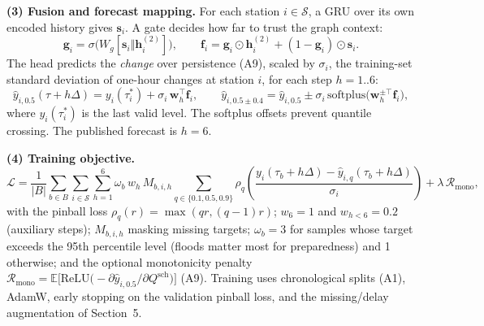 \textbf{(3) Fusion and forecast mapping.} For each station $i\in\mathcal{S}$, a GRU over its own
encoded history gives $\mathbf{s}_i$. A gate decides how far to trust the graph context:
\begin{equation}
\mathbf{g}_i=\sigma\big(W_g[\mathbf{s}_i\Vert\mathbf{h}^{(2)}_i]\big),\qquad
\mathbf{f}_i=\mathbf{g}_i\odot\mathbf{h}^{(2)}_i+(1-\mathbf{g}_i)\odot\mathbf{s}_i .
\end{equation}
The head predicts the \emph{change} over persistence (A9), scaled by $\sigma_i$, the training-set
standard deviation of one-hour changes at station $i$, for each step $h=1..6$:
\begin{equation}
\hat y_{i,0.5}(\tau+h\Delta)=y_i(\tau^{\ast}_i)+\sigma_i\,\mathbf{w}_{h}^{\top}\mathbf{f}_i,\qquad
\hat y_{i,0.5\pm0.4}=\hat y_{i,0.5}\pm\sigma_i\,\mathrm{softplus}\big(\mathbf{w}^{\pm\top}_{h}\mathbf{f}_i\big),
\end{equation}
where $y_i(\tau^{\ast}_i)$ is the last valid level. The softplus offsets prevent quantile crossing.
The published forecast is $h=6$.

\textbf{(4) Training objective.}
\begin{equation}
\mathcal{L}=\frac{1}{|B|}\sum_{b\in B}\sum_{i\in\mathcal{S}}\sum_{h=1}^{6}\omega_{b}\,w_h\,M_{b,i,h}
\sum_{q\in\{0.1,0.5,0.9\}}\rho_q\!\left(\frac{y_i(\tau_b+h\Delta)-\hat y_{i,q}(\tau_b+h\Delta)}{\sigma_i}\right)
+\lambda\,\mathcal{R}_{\mathrm{mono}},
\end{equation}
with the pinball loss $\rho_q(r)=\max(qr,(q-1)r)$; $w_6=1$ and $w_{h<6}=0.2$ (auxiliary steps);
$M_{b,i,h}$ masking missing targets; $\omega_b=3$ for samples whose target exceeds the 95th
percentile level (floods matter most for preparedness) and 1 otherwise; and the optional monotonicity
penalty $\mathcal{R}_{\mathrm{mono}}=\mathbb{E}\big[\mathrm{ReLU}\big(-\partial\hat y_{i,0.5}/\partial Q^{\mathrm{sch}}\big)\big]$ (A9).
Training uses chronological splits (A1), AdamW, early stopping on the validation pinball loss, and the
missing/delay augmentation of Section~5.

